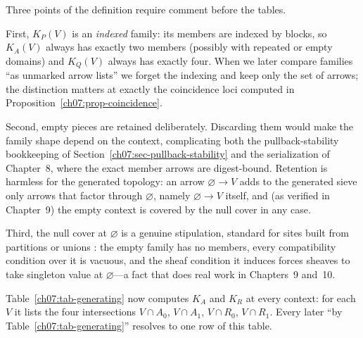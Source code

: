 Three points of the definition require comment before the tables.

First, $K_{P}(V)$ is an \emph{indexed} family: its members are indexed by blocks, so $K_{A}(V)$ always has exactly two members (possibly with repeated or empty domains) and $K_{Q}(V)$ always has exactly four. When we later compare families ``as unmarked arrow lists'' we forget the indexing and keep only the set of arrows; the distinction matters at exactly the coincidence loci computed in Proposition~\ref{ch07:prop-coincidence}.

Second, empty pieces are retained deliberately. Discarding them would make the family shape depend on the context, complicating both the pullback-stability bookkeeping of Section~\ref{ch07:sec-pullback-stability} and the serialization of Chapter~8, where the exact member arrows are digest-bound. Retention is harmless for the generated topology: an arrow $\varnothing\to V$ adds to the generated sieve only arrows that factor through $\varnothing$, namely $\varnothing\to V$ itself, and (as verified in Chapter~9) the empty context is covered by the null cover in any case.

Third, the null cover at $\varnothing$ is a genuine stipulation, standard for sites built from partitions or unions \cite{johnstone}: the empty family has no members, every compatibility condition over it is vacuous, and the sheaf condition it induces forces sheaves to take singleton value at $\varnothing$---a fact that does real work in Chapters~9 and~10.

Table~\ref{ch07:tab-generating} now computes $K_{A}$ and $K_{R}$ at every context: for each $V$ it lists the four intersections $V\cap A_{0}$, $V\cap A_{1}$, $V\cap R_{0}$, $V\cap R_{1}$. Every later ``by Table~\ref{ch07:tab-generating}'' resolves to one row of this table.

